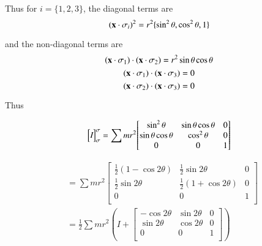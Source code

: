 \documentclass{article}      %
\begin{document}
Thus for $i=\{1, 2, 3\}$, the diagonal terms are
\[
(\mathbf{x} \cdot \sigma_i)^2 = r^2 \{ \sin^2 \theta, \cos^2 \theta, 1\}
\]

and the non-diagonal terms are
\[
(\mathbf{x} \cdot \sigma_1) \cdot (\mathbf{x} \cdot \sigma_2) = r^2 \sin\theta \cos\theta
\]
\[
(\mathbf{x} \cdot \sigma_1) \cdot (\mathbf{x} \cdot \sigma_3) = 0
\]
\[
(\mathbf{x} \cdot \sigma_2) \cdot (\mathbf{x} \cdot \sigma_3) = 0
\]

Thus 

\begin{align*}
{
\begin{bmatrix}
\emph{I}
\end{bmatrix}
}_\sigma^\sigma
&= 
\sum m r^2
{
\begin{bmatrix}
\sin^2 \theta  & \sin\theta \cos \theta & 0 \\
\sin\theta \cos \theta & \cos^2 \theta & 0 \\
0 & 0 & 1 \\
\end{bmatrix}
} \\
\end{align*}

\begin{align*}
&=
\sum 
m r^2
{
\begin{bmatrix}
\frac{1}{2} (1 - \cos 2\theta)    &   \frac{1}{2} \sin 2\theta      &     0 \\
\frac{1}{2} \sin 2\theta      &     \frac{1}{2}(1 + \cos 2\theta)    &    0 \\
0 & 0 & 1 \\
\end{bmatrix}
} \\
&=
\frac{1}{2} 
\sum 
m r^2
\left(
I + 
{
\begin{bmatrix}
- \cos 2\theta    &    \sin 2\theta     &    0 \\
\sin 2\theta      &     \cos 2\theta    &    0 \\
0 & 0 & 1 \\
\end{bmatrix}
}
\right) \\
\end{align*}
\end{document}
